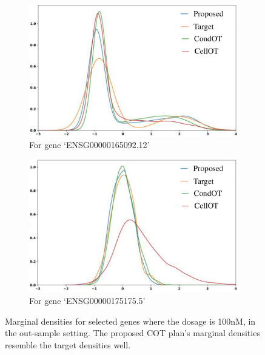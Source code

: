 \begin{figure}[t]
\centering
\begin{subfigure}{.4\textwidth}
    \centering
    \includegraphics[width=\textwidth]{chapter-3/images/C51.pdf}  
    \caption{For gene `ENSG00000165092.12'}
\end{subfigure}
\begin{subfigure}{.4\textwidth}
    \centering
    \includegraphics[width=\linewidth]{chapter-3/images/C52.pdf}  
    \caption{For gene `ENSG00000175175.5'}
    \label{fig:marginal-o}
\end{subfigure}
\caption{Marginal densities for selected genes where the dosage is 100nM, in the out-sample setting. The proposed COT plan's marginal densities resemble the target densities well.}
\end{figure}



